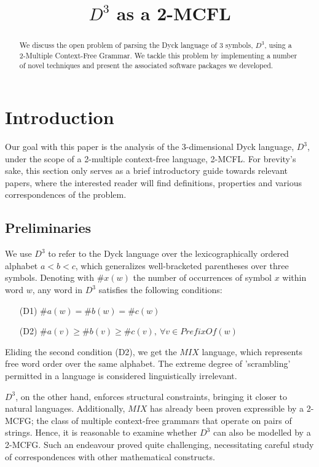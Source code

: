 \documentclass[nonatbib,numbers,10pt]{llncs}
\title{$D^3$ as a 2-MCFL}
\author{}
\institute{}
\begin{document}
\maketitle

\begin{abstract}
We discuss the open problem of parsing the Dyck language of 3 symbols, $D^3$, using a 2-Multiple Context-Free Grammar. We tackle this problem by implementing a number of novel techniques and present the associated software packages we developed.
\end{abstract}



\section{Introduction}\label{sec1}
Our goal with this paper is the analysis of the 3-dimensional Dyck language, $D^3$, under the scope of a 2-multiple context-free language, 2-MCFL. For brevity's sake, this section only serves as a brief introductory guide towards relevant papers, where the interested reader will find definitions, properties and various correspondences of the problem. 

\subsection{Preliminaries}
We use $D^3$ to refer to the Dyck language over the lexicographically ordered alphabet $a < b < c$, which generalizes well-bracketed parentheses over three symbols. Denoting with $\#x(w)$ the number of occurrences of symbol $x$ within word $w$, any word in $D^3$ satisfies the following conditions:
\begin{itemize}
\item[(D1)] $ \#a(w) = \#b(w) = \#c(w) $
\item[(D2)] $ \#a(v) \geq \#b(v) \geq \#c(v),\ \forall v \in \textit{PrefixOf}(w)$
\end{itemize}

Eliding the second condition (D2), we get the $MIX$ language, which represents free word order
over the same alphabet\cite{kanazawa}. The extreme degree of 'scrambling' permitted in a language is considered linguistically irrelevant\cite{joshi}.

$D^3$, on the other hand, enforces structural constraints, bringing it closer to natural languages.
Additionally, $MIX$ has already been proven expressible by a 2-MCFG\cite{salvati}; the class of multiple context-free grammars that operate on pairs of strings\cite{gotzmann}. Hence, it is reasonable to examine whether $D^3$ can also be modelled by a 2-MCFG. Such an endeavour proved quite challenging, necessitating careful study of correspondences with other mathematical constructs.
\end{document}
